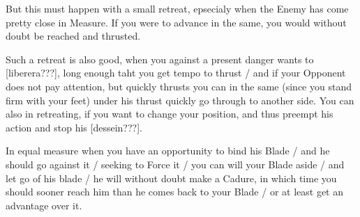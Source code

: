 \newpage


\newpage


But this must happen with a small retreat, epsecialy when the Enemy
has come pretty close in Measure. If you were to advance in the same,
you would without doubt be reached and thrusted.


Such a retreat is also good, when you against a present danger wants
to [liberera???], long enough taht you get tempo to
thrust / and if your Opponent does not pay attention, but quickly
thrusts you can in the same (since you stand firm with your feet)
under his thrust quickly go through to another side. You can also in
retreating, if you want to change your position, and thus preempt his
action and stop his [dessein???].


In equal measure when you have an opportunity to bind his Blade / and
he should go against it / seeking to Force it / you can will your
Blade aside / and let go of his blade / he will without doubt make a
Cadure, in which time you should sooner reach him than he comes back
to your Blade / or at least get an advantage over it.


